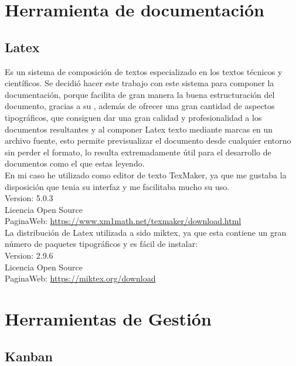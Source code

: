
\section{Herramienta de documentación}

\subsection{Latex}

Es un sistema de composición de textos especializado en los textos técnicos y científicos.
Se decidió hacer este trabajo con este sistema para componer la documentación, porque facilita de gran manera la buena estructuración del documento, gracias a su , además de ofrecer una gran cantidad de aspectos tipográficos, que consiguen dar una gran calidad y profesionalidad a los documentos resultantes y al componer Latex texto mediante marcas en un archivo fuente, esto permite previsualizar el documento desde cualquier entorno sin perder el formato, lo resulta extremadamente útil para el desarrollo de documentos como el que estas leyendo.\\

En mi caso he utilizado como editor de texto TexMaker, ya que me gustaba la disposición que tenia su interfaz y me facilitaba mucho su uso.\\

Version: 5.0.3\\
Licencia Open Source\\
PaginaWeb: \url{https://www.xm1math.net/texmaker/download.html}\\

La distribución de Latex utilizada a sido miktex, ya que esta contiene un gran número de paquetes tipográficos y es fácil de instalar:\\
Version: 2.9.6\\
Licencia Open Source\\
PaginaWeb: \url{https://miktex.org/download}\\


\section{Herramientas de Gestión}


\subsection{Kanban}

